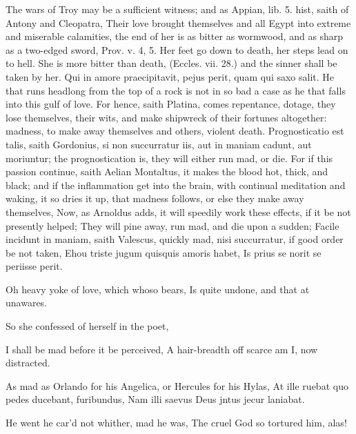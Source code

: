 {The wars of Troy may be a sufficient witness; and as Appian, lib. 5.
hist, saith of Antony and Cleopatra, Their love brought
themselves and all Egypt into extreme and miserable calamities, the end
of her is as bitter as wormwood, and as sharp as a two-edged sword,
Prov. v. 4, 5. Her feet go down to death, her steps lead on to hell.
She is more bitter than death, (Eccles. vii. 28.) and the sinner shall
be taken by her. Qui in amore praecipitavit, pejus perit, quam
qui saxo salit. He that runs headlong from the top of a rock is
not in so bad a case as he that falls into this gulf of love. For
hence, saith  Platina, comes repentance, dotage, they lose
themselves, their wits, and make shipwreck of their fortunes
altogether: madness, to make away themselves and others, violent death.
Prognosticatio est talis, saith Gordonius, si non succurratur
iis, aut in maniam cadunt, aut moriuntur; the prognostication is, they
will either run mad, or die. For if this passion continue, saith
Aelian Montaltus, it makes the blood hot, thick, and black; and
if the inflammation get into the brain, with continual meditation and
waking, it so dries it up, that madness follows, or else they make away
themselves,  Now, as
Arnoldus adds, it will speedily work these effects, if it be not
presently helped; They will pine away, run mad, and die upon a
sudden; Facile incidunt in maniam, saith Valescus, quickly mad, nisi
succurratur, if good order be not taken,
Ehou triste jugum quisquis amoris habet,
Is prius se norit se periisse perit.

Oh heavy yoke of love, which whoso bears,
Is quite undone, and that at unawares.

So she confessed of herself in the poet,

I shall be mad before it be perceived,
A hair-breadth off scarce am I, now distracted.

As mad as Orlando for his Angelica, or Hercules for his Hylas,
At ille ruebat quo pedes ducebant, furibundus,
Nam illi saevus Deus jntus jecur laniabat.

He went he car'd not whither, mad he was,
The cruel God so tortured him, alas!

}
